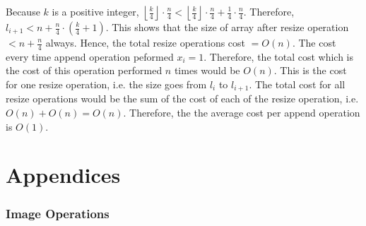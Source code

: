 \documentclass[addpoints]{exam}
\begin{document}
\begin{questions}
\begin{solution}
    Because $k$ is a positive integer, $\left\lfloor \frac{k}{4} \right\rfloor \cdot \frac{n}{4} < \left\lfloor \frac{k}{4} \right\rfloor \cdot \frac{n}{4} + \frac{1}{4} \cdot \frac{n}{4}$.
    \newline
    \newline
    Therefore, $l_{i+1} < n + \frac{n}{4} \cdot \left(\frac{k}{4} + 1\right)$.
    \newline
    \newline
    This shows that the size of array after resize operation $ < n + \frac{n}{4}$ always. Hence, the total resize operations cost $ = O(n)$.
    \newline
    \newline
    The cost every time append operation peformed $x_i =  1$. Therefore, the total cost which is the cost of this operation performed $n$ times would be $O(n)$. This is the cost for one resize operation, i.e. the size goes from $l_i$ to $l_{i+1}$.
    \newline
    \newline
    The total cost for all resize operations would be the sum of the cost of each of the resize operation, i.e. $O(n) + O(n) = O(n)$. Therefore, the the average cost per append operation is $O(1)$.
    


  \end{solution}

\end{questions}

\newpage
\part{Appendices}

\appendix
\section{}


\newpage
\section{}


\newpage
\section{Image Operations}

\end{document}
